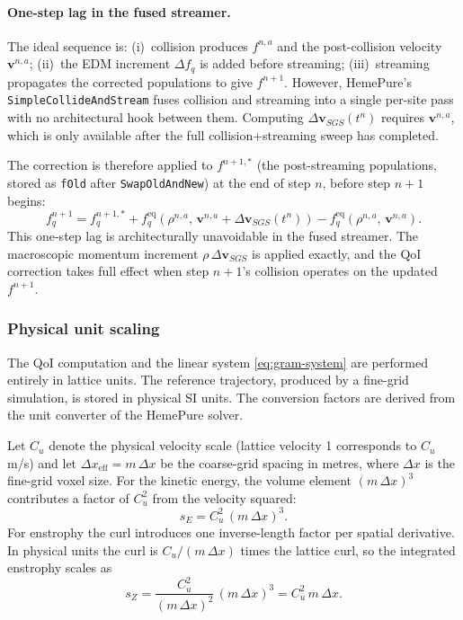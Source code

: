 \documentclass[]{elsarticle}
\begin{document}
\paragraph{One-step lag in the fused streamer.}
The ideal sequence is: (i)~collision produces $f^{n,a}$ and the post-collision velocity $\boldsymbol{v}^{n,a}$; (ii)~the EDM increment $\Delta f_q$ is added before streaming; (iii)~streaming propagates the corrected populations to give $f^{n+1}$. However, HemePure's \texttt{SimpleCollideAndStream} fuses collision and streaming into a single per-site pass with no architectural hook between them. Computing $\Delta\boldsymbol{v}_{SGS}(t^n)$ requires $\boldsymbol{v}^{n,a}$, which is only available after the full collision+streaming sweep has completed.

The correction is therefore applied to $f^{n+1,*}$ (the post-streaming populations, stored as \texttt{fOld} after \texttt{SwapOldAndNew}) at the end of step $n$, before step $n{+}1$ begins:
\begin{equation}
    f_q^{n+1} = f_q^{n+1,*} + f_q^{\mathrm{eq}}\!\left(\rho^{n,a},\, \boldsymbol{v}^{n,a} + \Delta\boldsymbol{v}_{SGS}(t^n)\right) - f_q^{\mathrm{eq}}\!\left(\rho^{n,a},\, \boldsymbol{v}^{n,a}\right).
\end{equation}
This one-step lag is architecturally unavoidable in the fused streamer. The macroscopic momentum increment $\rho\,\Delta\boldsymbol{v}_{SGS}$ is applied exactly, and the QoI correction takes full effect when step $n{+}1$'s collision operates on the updated $f^{n+1}$.

\subsubsection{Physical unit scaling}
\label{sec:physical-scaling-3d}

The QoI computation and the linear system \eqref{eq:gram-system} are performed entirely in lattice units. The reference trajectory, produced by a fine-grid simulation, is stored in physical SI units. The conversion factors are derived from the unit converter of the HemePure solver.

Let $C_u$ denote the physical velocity scale (lattice velocity 1 corresponds to $C_u$ m/s) and let $\Delta x_{\mathrm{eff}} = m\,\Delta x$ be the coarse-grid spacing in metres, where $\Delta x$ is the fine-grid voxel size. For the kinetic energy, the volume element $(m\,\Delta x)^3$ contributes a factor of $C_u^2$ from the velocity squared:
\begin{equation}
    s_E = C_u^2\, (m\,\Delta x)^3.
\end{equation}
For enstrophy the curl introduces one inverse-length factor per spatial derivative. In physical units the curl is $C_u / (m\,\Delta x)$ times the lattice curl, so the integrated enstrophy scales as
\begin{equation}
    s_Z = \frac{C_u^2}{(m\,\Delta x)^2}\,(m\,\Delta x)^3 = C_u^2\,m\,\Delta x.
\end{equation}
\end{document}
